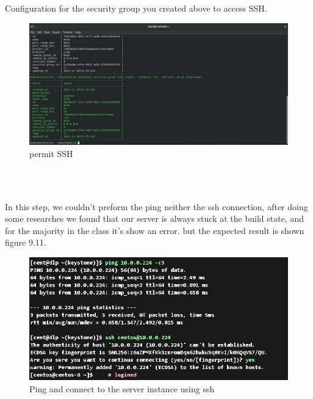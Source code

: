 \begin{spacing}{1.2}
\par Configuration for the security group you created above to access SSH.
\\
\begin{figure}[!htb] 
\begin{center} 
\includegraphics[width=1\linewidth]{Cloud/Creating and Running Instances/permit SSH} 
\end{center} 
\caption{permit SSH} 
\end{figure} 
\FloatBarrier
\\\
\par In this step, we couldn't preform the ping neither the ssh connection, after doing some researches we found that our server is always stuck at the build state, and for the majority in the class it's show an error. but the expected result is shown figure 9.11.
\\
\begin{figure}[!htb] 
\begin{center} 
\includegraphics[width=1\linewidth]{Cloud/Creating and Running Instances/C_1_expected_result_for_us_we_stuck_at_build.png} 
\end{center} 
\caption{Ping and connect to the server instance using ssh} 
\end{figure} 
\FloatBarrier
\\

\end{spacing}
